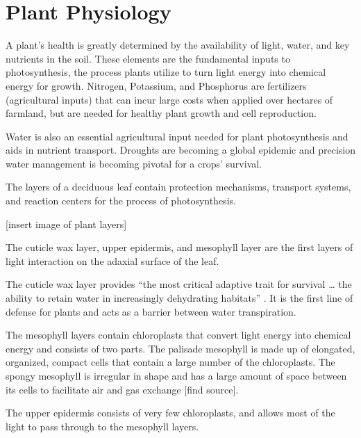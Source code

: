 \section{Plant Physiology}
A plant's health is greatly determined by the availability of light, water, and key nutrients in the soil.  These elements are the fundamental inputs to photosynthesis, the process plants utilize to turn light energy into chemical energy for growth.  Nitrogen, Potassium, and Phosphorus are fertilizers (agricultural inputs) that can incur large costs when applied over hectares of farmland, but are needed for healthy plant growth and cell reproduction.

Water is also an essential agricultural input needed for plant photosynthesis and aids in nutrient transport.  Droughts are becoming a global epidemic and precision water management is becoming pivotal for a crops' survival.

The layers of a deciduous leaf contain protection mechanisms, transport systems, and reaction centers for the process of photosynthesis.

[insert image of plant layers]

The cuticle wax layer, upper epidermis, and mesophyll layer are the first layers of light interaction on the adaxial surface of the leaf.

The cuticle wax layer provides “the most critical adaptive trait for survival … the ability to retain water in increasingly dehydrating habitats” \cite{cuticle}.  It is the first line of defense for plants and acts as a barrier between water transpiration.

The mesophyll layers contain chloroplasts that convert light energy into chemical energy and consists of two parts. The palisade mesophyll is made up of elongated, organized, compact cells that contain a large number of the chloroplasts.  The spongy mesophyll is irregular in shape and has a large amount of space between its cells to facilitate air and gas exchange [find source].

The upper epidermis consists of very few chloroplasts, and allows most of the light to pass through to the mesophyll layers.




